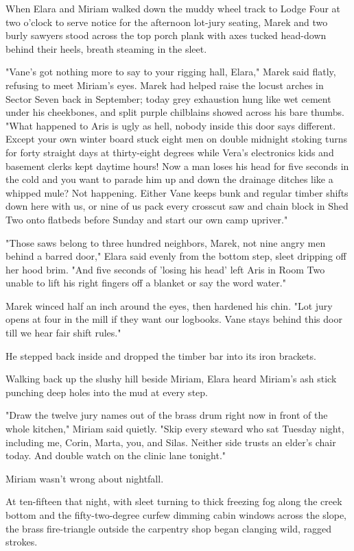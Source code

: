When Elara and Miriam walked down the muddy wheel track to Lodge Four at two o'clock to serve notice for the afternoon lot-jury seating, Marek and two burly sawyers stood across the top porch plank with axes tucked head-down behind their heels, breath steaming in the sleet.

"Vane's got nothing more to say to your rigging hall, Elara," Marek said flatly, refusing to meet Miriam's eyes. Marek had helped raise the locust arches in Sector Seven back in September; today grey exhaustion hung like wet cement under his cheekbones, and split purple chilblains showed across his bare thumbs. "What happened to Aris is ugly as hell, nobody inside this door says different. Except your own winter board stuck eight men on double midnight stoking turns for forty straight days at thirty-eight degrees while Vera's electronics kids and basement clerks kept daytime hours! Now a man loses his head for five seconds in the cold and you want to parade him up and down the drainage ditches like a whipped mule? Not happening. Either Vane keeps bunk and regular timber shifts down here with us, or nine of us pack every crosscut saw and chain block in Shed Two onto flatbeds before Sunday and start our own camp upriver."

"Those saws belong to three hundred neighbors, Marek, not nine angry men behind a barred door," Elara said evenly from the bottom step, sleet dripping off her hood brim. "And five seconds of 'losing his head' left Aris in Room Two unable to lift his right fingers off a blanket or say the word water."

Marek winced half an inch around the eyes, then hardened his chin. "Lot jury opens at four in the mill if they want our logbooks. Vane stays behind this door till we hear fair shift rules."

He stepped back inside and dropped the timber bar into its iron brackets.

Walking back up the slushy hill beside Miriam, Elara heard Miriam's ash stick punching deep holes into the mud at every step.

"Draw the twelve jury names out of the brass drum right now in front of the whole kitchen," Miriam said quietly. "Skip every steward who sat Tuesday night, including me, Corin, Marta, you, and Silas. Neither side trusts an elder's chair today. And double watch on the clinic lane tonight."

Miriam wasn't wrong about nightfall.

At ten-fifteen that night, with sleet turning to thick freezing fog along the creek bottom and the fifty-two-degree curfew dimming cabin windows across the slope, the brass fire-triangle outside the carpentry shop began clanging wild, ragged strokes.

